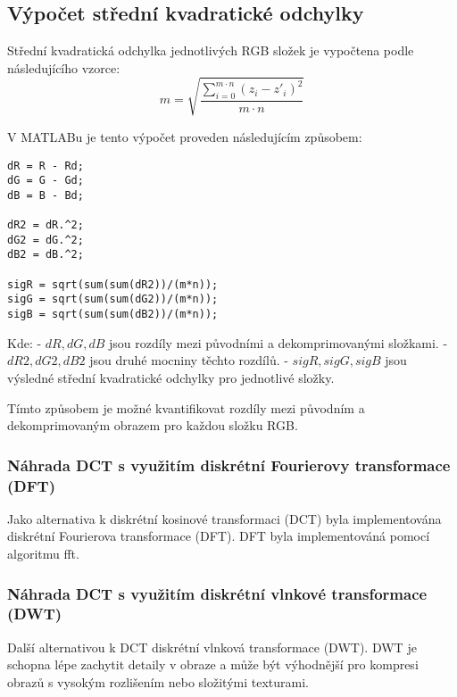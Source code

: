\subsection*{Výpočet střední kvadratické odchylky}
Střední kvadratická odchylka jednotlivých RGB složek je vypočtena podle následujícího vzorce:
\[
m = \sqrt{\frac{\sum_{i=0}^{m \cdot n} (z_i - z'_i)^2}{m \cdot n}}
\]

V MATLABu je tento výpočet proveden následujícím způsobem:
\begin{verbatim}
dR = R - Rd;
dG = G - Gd;
dB = B - Bd;

dR2 = dR.^2;
dG2 = dG.^2;
dB2 = dB.^2;

sigR = sqrt(sum(sum(dR2))/(m*n));
sigG = sqrt(sum(sum(dG2))/(m*n));
sigB = sqrt(sum(sum(dB2))/(m*n));
\end{verbatim}

Kde:
- \( dR, dG, dB \) jsou rozdíly mezi původními a dekomprimovanými složkami.
- \( dR2, dG2, dB2 \) jsou druhé mocniny těchto rozdílů.
- \( sigR, sigG, sigB \) jsou výsledné střední kvadratické odchylky pro jednotlivé složky.

Tímto způsobem je možné kvantifikovat rozdíly mezi původním a dekomprimovaným obrazem pro každou složku RGB.

\subsubsection*{Náhrada DCT s využitím diskrétní Fourierovy transformace (DFT)}

Jako alternativa k diskrétní kosinové transformaci (DCT) byla implementována diskrétní Fourierova transformace (DFT). DFT byla implementováná pomocí algoritmu fft.\cite{FFTWiki}

\subsubsection*{Náhrada DCT s využitím diskrétní vlnkové transformace (DWT)}

Další alternativou k DCT diskrétní vlnková transformace (DWT). DWT je schopna lépe zachytit detaily v obraze a může být výhodnější pro kompresi obrazů s vysokým rozlišením nebo složitými texturami.\cite{WaveletWiki}